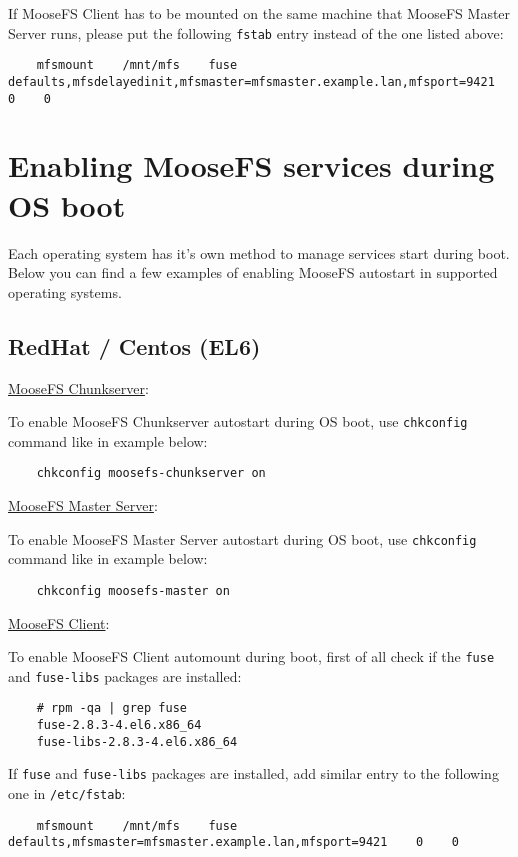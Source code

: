 \documentclass[a4paper,11pt,english]{report}
\def\code#1{\texttt{#1}}
\begin{document}
		If MooseFS Client has to be mounted on the same machine that MooseFS Master Server runs, please put the following \code{fstab} entry instead of the one listed above:
		
		\begin{lstlisting}
	mfsmount    /mnt/mfs    fuse    defaults,mfsdelayedinit,mfsmaster=mfsmaster.example.lan,mfsport=9421    0    0 
		\end{lstlisting}

		\newpage

		\section{Enabling MooseFS services during OS boot}
		Each operating system has it's own method to manage services start during boot. Below you can find a few examples of enabling MooseFS autostart in supported operating systems.
		
					
		\subsection{RedHat / Centos (EL6)}
		
		\underline{MooseFS Chunkserver}:
		
		To enable MooseFS Chunkserver autostart during OS boot, use \code{chkconfig} command like in example below:
		\begin{lstlisting}
	chkconfig moosefs-chunkserver on
		\end{lstlisting}
		
		\underline{MooseFS Master Server}:
		
		To enable MooseFS Master Server autostart during OS boot, use \code{chkconfig} command like in example below:
		\begin{lstlisting}
	chkconfig moosefs-master on
		\end{lstlisting}
		
		\underline{MooseFS Client}:
		
		To enable MooseFS Client automount during boot, first of all check if the \code{fuse} and \code{fuse-libs} packages are installed:
		\begin{lstlisting}
	# rpm -qa | grep fuse
	fuse-2.8.3-4.el6.x86_64
	fuse-libs-2.8.3-4.el6.x86_64
		\end{lstlisting}
		
		If \code{fuse} and \code{fuse-libs} packages are installed, add similar entry to the following one in \code{/etc/fstab}:

		\begin{lstlisting}
	mfsmount    /mnt/mfs    fuse    defaults,mfsmaster=mfsmaster.example.lan,mfsport=9421    0    0 
		\end{lstlisting}
		
\end{document}

